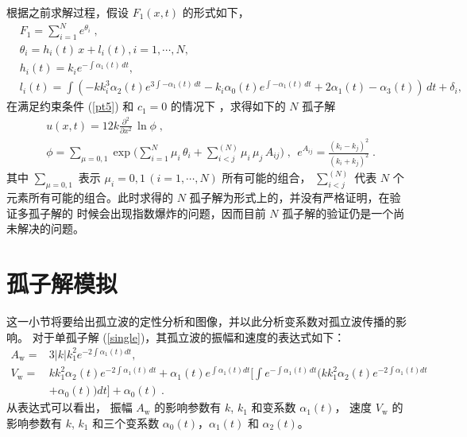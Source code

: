 根据之前求解过程，假设 $F_1(x,t)$ 的形式如下，
\begin{align}
& F_1=\sum_{i = 1}^{N} e^{\theta_i}\;,
 \label{kdv-286}\\
&\theta_{i}=h_{i}(t)\,x+l_{i}(t),i=1,\cdots,N ,\\
&h_{i}(t)=k_i e^{-\int \alpha _1(t) \, dt},\\
&l_{i}(t)=\int \left(- k k_i^3 \alpha _2(t)e^{3 \int -\alpha _1(t) \, dt}-k_i \alpha _0(t) e^{\int -\alpha _1(t) \, dt}+2 \alpha _1(t)-\alpha _3(t)\right) \, dt+\delta_i,
\end{align}
在满足约束条件 (\ref{pt5}) 和 $c_1=0$ 的情况下
，求得如下的 $N$ 孤子解
\begin{align}
& u(x,t) = 12k\frac{\partial^{2}}{\partial
x^{2}}\, \ln \phi
 \;,   \label{kdv-287}\\
&\phi=\sum_{\mu =0, 1}\exp\Big(\sum_{i =
1}^{N}\mu_i\,\theta_i+ \sum_{ i< j}^{(N)}\mu_i\,\mu_j\,A_{ij}\Big)\;
,\ \  e^{A_{ij}}=\frac{(k_i-k_j)^2}
{(k_i+k_j)^2}\; .
\label{kdv-288}
\end{align}
其中 $\sum_{\mu =0, 1}$ 表示 $\mu_i=0,1\,(i=1,\cdots,N)$ 所有可能的组合， $\sum_{i<
j}^{(N)}$ 代表 $N$ 个元素所有可能的组合。此时求得的 $N$ 孤子解为形式上的，并没有严格证明，在验证多孤子解的
时候会出现指数爆炸的问题，因而目前 $N$ 孤子解的验证仍是一个尚未解决的问题。


\section{孤子解模拟}
这一小节将要给出孤立波的定性分析和图像，并以此分析变系数对孤立波传播的影响。
对于单孤子解 (\ref{single})，其孤立波的振幅和速度的表达式如下：
\begin{align}
A_{\mbox{w}}=&3| k| k_1^2 e^{-2 \int \!\alpha _1(t)  dt},\label{A_ISW}
\\ \nonumber
 V_{\mbox{w}}=&k k_1^2 \alpha_2(t) e^{-2 \int \!\! \alpha_1(t) \, dt}+\alpha_1(t) e^{\int \! \alpha _1(t)  dt} [\int e^{-\int \!\!\alpha _1(t) \, dt} (k k_1^2 \alpha _2(t) e^{-2 \int \! \!\alpha _1(t)  dt} \\
 &+\alpha _0(t))  dt] +\alpha _0(t) \  . \label{V_ISW}
\end{align}
从表达式可以看出， 振幅 $A_{\mbox{w}}$ 的影响参数有 $k$, $k_1$ 和变系数 $\alpha_1(t)$， 速度 $V_{\mbox{w}}$ 的影响参数有 $k$, $k_1$ 和三个变系数 $\alpha_0(t)$，$\alpha_1(t)$ 和 $\alpha_2(t)$。

